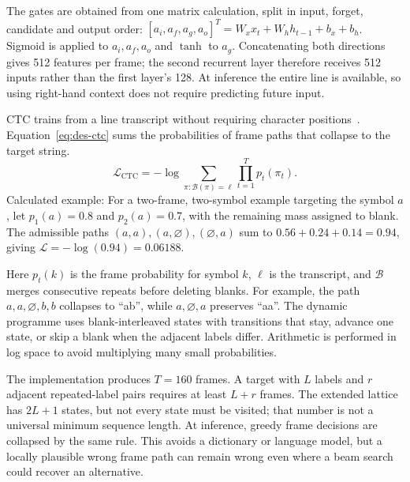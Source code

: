 The gates are obtained from one matrix calculation, split in input, forget, candidate and output order: $[a_i,a_f,a_g,a_o]^T=W_xx_t+W_hh_{t-1}+b_x+b_h$. Sigmoid is applied to $a_i,a_f,a_o$ and $\tanh$ to $a_g$. Concatenating both directions gives 512 features per frame; the second recurrent layer therefore receives 512 inputs rather than the first layer's 128. At inference the entire line is available, so using right-hand context does not require predicting future input.~\cite[recognise.py; train.py; trainlibrary.py]{braunepipeline2026}

CTC trains from a line transcript without requiring character positions~\cite[PDF pp.~2--3]{graves2006}. Equation~\ref{eq:des-ctc} sums the probabilities of frame paths that collapse to the target string.
\begin{equation}
\mathcal L_{\mathrm{CTC}}=-\log\sum_{\pi:\mathcal B(\pi)=\boldsymbol\ell}
\prod_{t=1}^{T}p_t(\pi_t).
\label{eq:des-ctc}
\end{equation}
Calculated example: For a two-frame, two-symbol example targeting the symbol $a$, let $p_1(a)=0.8$ and $p_2(a)=0.7$, with the remaining mass assigned to blank. The admissible paths $(a,a),(a,\varnothing),(\varnothing,a)$ sum to $0.56+0.24+0.14=0.94$, giving $\mathcal L=-\log(0.94)=0.06188$. \cite[train.py, CtcLoss]{braunepipeline2026}

Here $p_t(k)$ is the frame probability for symbol $k$, $\boldsymbol\ell$ is the transcript, and $\mathcal B$ merges consecutive repeats before deleting blanks. For example, the path $a,a,\varnothing,b,b$ collapses to ``ab'', while $a,\varnothing,a$ preserves ``aa''. The dynamic programme uses blank-interleaved states with transitions that stay, advance one state, or skip a blank when the adjacent labels differ. Arithmetic is performed in log space to avoid multiplying many small probabilities.~\cite[recognise.py; train.py; trainlibrary.py]{braunepipeline2026}

The implementation produces $T=160$ frames. A target with $L$ labels and $r$ adjacent repeated-label pairs requires at least $L+r$ frames. The extended lattice has $2L+1$ states, but not every state must be visited; that number is not a universal minimum sequence length. At inference, greedy frame decisions are collapsed by the same rule. This avoids a dictionary or language model, but a locally plausible wrong frame path can remain wrong even where a beam search could recover an alternative.~\cite[recognise.py; train.py; trainlibrary.py]{braunepipeline2026}

